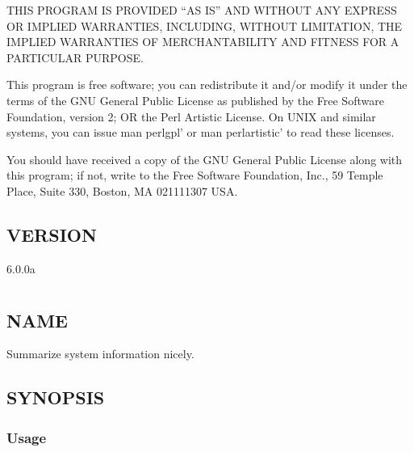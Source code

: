 \documentclass[letterpaper,10pt,english]{sphinxmanual}
\begin{document}
\sphinxAtStartPar
THIS PROGRAM IS PROVIDED “AS IS” AND WITHOUT ANY EXPRESS OR IMPLIED
WARRANTIES, INCLUDING, WITHOUT LIMITATION, THE IMPLIED WARRANTIES OF
MERCHANTABILITY AND FITNESS FOR A PARTICULAR PURPOSE.

\sphinxAtStartPar
This program is free software; you can redistribute it and/or modify it under
the terms of the GNU General Public License as published by the Free Software
Foundation, version 2; OR the Perl Artistic License.  On UNIX and similar
systems, you can issue \textasciigrave{}man perlgpl’ or \textasciigrave{}man perlartistic’ to read these
licenses.

\sphinxAtStartPar
You should have received a copy of the GNU General Public License along with
this program; if not, write to the Free Software Foundation, Inc., 59 Temple
Place, Suite 330, Boston, MA  02111\sphinxhyphen{}1307  USA.


\section{VERSION}
\label{\detokenize{mariadb-summary:version}}
\sphinxAtStartPar
{} 6.0.0a


\chapter{}
\label{\detokenize{mariadb-system-summary:mariadb-system-summary}}\label{\detokenize{mariadb-system-summary::doc}}

\section{NAME}
\label{\detokenize{mariadb-system-summary:name}}
\sphinxAtStartPar
{} \sphinxhyphen{} Summarize system information nicely.


\section{SYNOPSIS}
\label{\detokenize{mariadb-system-summary:synopsis}}

\subsection{Usage}
\label{\detokenize{mariadb-system-summary:usage}}
\begin{sphinxVerbatim}[commandchars=\\\{\}]
\end{sphinxVerbatim}
\end{document}
